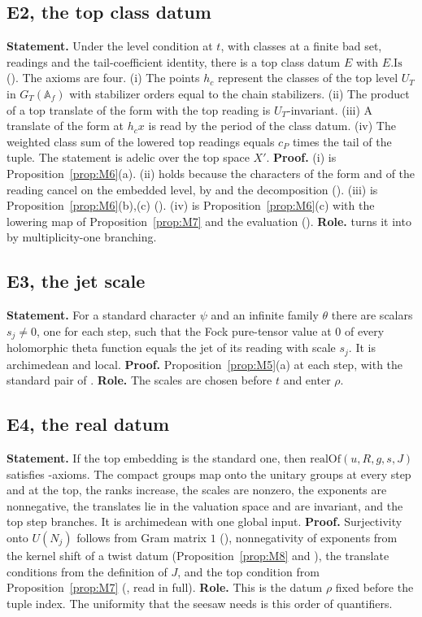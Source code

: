 \documentclass[11pt]{article}
\newcommand{\Af}{\mathbb A_f}
\theoremstyle{remark}
\begin{document}
\subsection{E2, the top class datum}
\textbf{Statement.} Under the level condition at $t$, with classes  at a finite bad set, readings  and the tail-coefficient identity, there is a top class datum $E$ with $E.\mathrm{Is}$ (). The axioms are four. (i) The points $h_c$ represent the classes of the top level $U_T$ in $G_T(\Af)$ with stabilizer orders equal to the chain stabilizers. (ii) The product of a top translate of the form with the top reading is $U_T$-invariant. (iii) A translate of the form at $h_cx$ is read by the period of the class datum. (iv) The weighted class sum of the lowered top readings equals $c_P$ times the tail of the tuple. The statement is adelic over the top space $X'$. \textbf{Proof.} (i) is Proposition~\ref{prop:M6}(a). (ii) holds because the characters of the form and of the reading cancel on the embedded level, by  and the decomposition  (). (iii) is Proposition~\ref{prop:M6}(b),(c) (). (iv) is Proposition~\ref{prop:M6}(c) with the lowering map of Proposition~\ref{prop:M7} and the evaluation  (). \textbf{Role.}  turns it into  by multiplicity-one branching.

\subsection{E3, the jet scale}
\textbf{Statement.} For a standard character $\psi$ and an infinite family $\theta$ there are scalars $s_j\neq0$, one for each step, such that the Fock pure-tensor value at $0$ of every holomorphic theta function equals the jet of its reading with scale $s_j$. It is archimedean and local. \textbf{Proof.} Proposition~\ref{prop:M5}(a) at each step, with the standard pair of . \textbf{Role.} The scales are chosen before $t$ and enter $\rho$.

\subsection{E4, the real datum}
\textbf{Statement.} If the top embedding is the standard one, then $\mathrm{realOf}(u,R,g,s,J)$ satisfies -axioms. The compact groups map onto the unitary groups at every step and at the top, the ranks increase, the scales are nonzero, the exponents are nonnegative, the translates lie in the valuation space and are invariant, and the top step branches. It is archimedean with one global input. \textbf{Proof.} Surjectivity onto $U(N_j)$ follows from Gram matrix $1$ (), nonnegativity of exponents from the kernel shift of a twist datum (Proposition~\ref{prop:M8} and ), the translate conditions from the definition of $J$, and the top condition from Proposition~\ref{prop:M7} (, read in full). \textbf{Role.} This is the datum $\rho$ fixed before the tuple index. The uniformity that the seesaw needs is this order of quantifiers.
\end{document}

